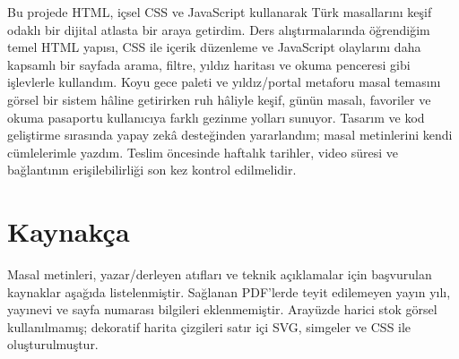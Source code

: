 \documentclass[12pt,a4paper]{article}
\begin{document}
Bu projede HTML, içsel CSS ve JavaScript kullanarak Türk masallarını keşif odaklı bir dijital atlasta bir araya getirdim. Ders alıştırmalarında öğrendiğim temel HTML yapısı, CSS ile içerik düzenleme ve JavaScript olaylarını daha kapsamlı bir sayfada arama, filtre, yıldız haritası ve okuma penceresi gibi işlevlerle kullandım. Koyu gece paleti ve yıldız/portal metaforu masal temasını görsel bir sistem hâline getirirken ruh hâliyle keşif, günün masalı, favoriler ve okuma pasaportu kullanıcıya farklı gezinme yolları sunuyor. Tasarım ve kod geliştirme sırasında yapay zekâ desteğinden yararlandım; masal metinlerini kendi cümlelerimle yazdım. Teslim öncesinde haftalık tarihler, video süresi ve bağlantının erişilebilirliği son kez kontrol edilmelidir.

\section{Kaynakça}
Masal metinleri, yazar/derleyen atıfları ve teknik açıklamalar için başvurulan kaynaklar aşağıda listelenmiştir. Sağlanan PDF'lerde teyit edilemeyen yayın yılı, yayınevi ve sayfa numarası bilgileri eklenmemiştir. Arayüzde harici stok görsel kullanılmamış; dekoratif harita çizgileri satır içi SVG, simgeler ve CSS ile oluşturulmuştur.
\end{document}
